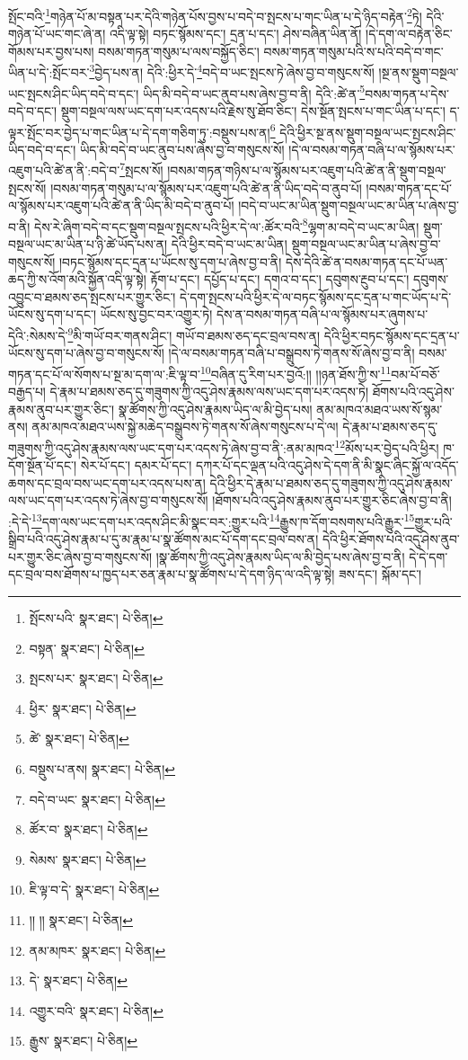 སྤོང་བའི་\footnote{སྤོངས་པའི་  སྣར་ཐང་།  པེ་ཅིན། }གཉེན་པོ་མ་བསྟན་པར་དེའི་གཉེན་པོས་བྱས་པ་བདེ་བ་སྤངས་པ་གང་ཡིན་པ་དེ་ཉིད་བརྟེན་\footnote{བསྟན་  སྣར་ཐང་།  པེ་ཅིན། }ཏེ། དེའི་གཉེན་པོ་ཡང་གང་ཞེ་ན། འདི་ལྟ་སྟེ། བཏང་སྙོམས་དང་། དྲན་པ་དང་། ཤེས་བཞིན་ཡིན་ནོ། །དེ་དག་ལ་བརྟེན་ཅིང་གོམས་པར་བྱས་པས། བསམ་གཏན་གསུམ་པ་ལས་བསྐྱོད་ཅིང་། བསམ་གཏན་གསུམ་པའི་ས་པའི་བདེ་བ་གང་ཡིན་པ་དེ་:སྤོང་བར་\footnote{སྤངས་པར་  སྣར་ཐང་།  པེ་ཅིན། }བྱེད་པས་ན། དེའི་:ཕྱིར་དེ་\footnote{ཕྱིར་  སྣར་ཐང་།  པེ་ཅིན། }བདེ་བ་ཡང་སྤངས་ཏེ་ཞེས་བྱ་བ་གསུངས་སོ། །སྔ་ནས་སྡུག་བསྔལ་ཡང་སྤངས་ཤིང་ཡིད་བདེ་བ་དང་། ཡིད་མི་བདེ་བ་ཡང་ནུབ་པས་ཞེས་བྱ་བ་ནི། དེའི་:ཚེ་ན་\footnote{ཚེ་  སྣར་ཐང་།  པེ་ཅིན། }བསམ་གཏན་པ་དེས་བདེ་བ་དང་། སྡུག་བསྔལ་ལས་ཡང་དག་པར་འདས་པའི་རྗེས་སུ་ཐོབ་ཅིང་། དེས་སྔོན་སྤངས་པ་གང་ཡིན་པ་དང་། ད་ལྟར་སྤོང་བར་བྱེད་པ་གང་ཡིན་པ་དེ་དག་གཅིག་ཏུ་:བསྡུས་པས་ན།\footnote{བསྡུས་པ་ནས།  སྣར་ཐང་།  པེ་ཅིན། } དེའི་ཕྱིར་སྔ་ནས་སྡུག་བསྔལ་ཡང་སྤངས་ཤིང་ཡིད་བདེ་བ་དང་། ཡིད་མི་བདེ་བ་ཡང་ནུབ་པས་ཞེས་བྱ་བ་གསུངས་སོ། །དེ་ལ་བསམ་གཏན་བཞི་པ་ལ་སྙོམས་པར་འཇུག་པའི་ཚེ་ན་ནི་:བདེ་བ་\footnote{བདེ་བ་ཡང་  སྣར་ཐང་།  པེ་ཅིན། }སྤངས་སོ། །བསམ་གཏན་གཉིས་པ་ལ་སྙོམས་པར་འཇུག་པའི་ཚེ་ན་ནི་སྡུག་བསྔལ་སྤངས་སོ། །བསམ་གཏན་གསུམ་པ་ལ་སྙོམས་པར་འཇུག་པའི་ཚེ་ན་ནི་ཡིད་བདེ་བ་ནུབ་པོ། །བསམ་གཏན་དང་པོ་ལ་སྙོམས་པར་འཇུག་པའི་ཚེ་ན་ནི་ཡིད་མི་བདེ་བ་ནུབ་པོ། །བདེ་བ་ཡང་མ་ཡིན་སྡུག་བསྔལ་ཡང་མ་ཡིན་པ་ཞེས་བྱ་བ་ནི། དེས་རེ་ཞིག་བདེ་བ་དང་སྡུག་བསྔལ་སྤངས་པའི་ཕྱིར་དེ་ལ་:ཚོར་བའི་\footnote{ཚོར་བ་  སྣར་ཐང་།  པེ་ཅིན། }ལྷག་མ་བདེ་བ་ཡང་མ་ཡིན། སྡུག་བསྔལ་ཡང་མ་ཡིན་པ་ཉི་ཚེ་ཡོད་པས་ན། དེའི་ཕྱིར་བདེ་བ་ཡང་མ་ཡིན། སྡུག་བསྔལ་ཡང་མ་ཡིན་པ་ཞེས་བྱ་བ་གསུངས་སོ། །བཏང་སྙོམས་དང་དྲན་པ་ཡོངས་སུ་དག་པ་ཞེས་བྱ་བ་ནི། དེས་དེའི་ཚེ་ན་བསམ་གཏན་དང་པོ་ཡན་ཆད་ཀྱི་ས་འོག་མའི་སྐྱོན་འདི་ལྟ་སྟེ། རྟོག་པ་དང་། དཔྱོད་པ་དང་། དགའ་བ་དང་། དབུགས་རྔུབ་པ་དང་། དབུགས་འབྱུང་བ་ཐམས་ཅད་སྤངས་པར་གྱུར་ཅིང་། དེ་དག་སྤངས་པའི་ཕྱིར་དེ་ལ་བཏང་སྙོམས་དང་དྲན་པ་གང་ཡོད་པ་དེ་ཡོངས་སུ་དག་པ་དང་། ཡོངས་སུ་བྱང་བར་འགྱུར་ཏེ། དེས་ན་བསམ་གཏན་བཞི་པ་ལ་སྙོམས་པར་ཞུགས་པ་དེའི་:སེམས་དེ་\footnote{སེམས་  སྣར་ཐང་།  པེ་ཅིན། }མི་གཡོ་བར་གནས་ཤིང་། གཡོ་བ་ཐམས་ཅད་དང་བྲལ་བས་ན། དེའི་ཕྱིར་བཏང་སྙོམས་དང་དྲན་པ་ཡོངས་སུ་དག་པ་ཞེས་བྱ་བ་གསུངས་སོ། །དེ་ལ་བསམ་གཏན་བཞི་པ་བསྒྲུབས་ཏེ་གནས་སོ་ཞེས་བྱ་བ་ནི། བསམ་གཏན་དང་པོ་ལ་སོགས་པ་སྔ་མ་དག་ལ་:ཇི་ལྟ་བ་\footnote{ཇི་ལྟ་བ་དེ་  སྣར་ཐང་།  པེ་ཅིན། }བཞིན་དུ་རིག་པར་བྱའོ:།། །།ཉན་ཐོས་ཀྱི་ས་\footnote{།། །།  སྣར་ཐང་།  པེ་ཅིན། }བམ་པོ་བཅོ་བརྒྱད་པ། དེ་རྣམ་པ་ཐམས་ཅད་དུ་གཟུགས་ཀྱི་འདུ་ཤེས་རྣམས་ལས་ཡང་དག་པར་འདས་ཏེ། ཐོགས་པའི་འདུ་ཤེས་རྣམས་ནུབ་པར་གྱུར་ཅིང་། སྣ་ཚོགས་ཀྱི་འདུ་ཤེས་རྣམས་ཡིད་ལ་མི་བྱེད་པས། ནམ་མཁའ་མཐའ་ཡས་སོ་སྙམ་ནས། ནམ་མཁའ་མཐའ་ཡས་སྐྱེ་མཆེད་བསྒྲུབས་ཏེ་གནས་སོ་ཞེས་གསུངས་པ་དེ་ལ། དེ་རྣམ་པ་ཐམས་ཅད་དུ་གཟུགས་ཀྱི་འདུ་ཤེས་རྣམས་ལས་ཡང་དག་པར་འདས་ཏེ་ཞེས་བྱ་བ་ནི་:ནམ་མཁའ་\footnote{ནམ་མཁར་  སྣར་ཐང་།  པེ་ཅིན། }མོས་པར་བྱེད་པའི་ཕྱིར། ཁ་དོག་སྔོན་པོ་དང་། སེར་པོ་དང་། དམར་པོ་དང་། དཀར་པོ་དང་ལྡན་པའི་འདུ་ཤེས་དེ་དག་ནི་མི་སྣང་ཞིང་སྐྱོ་ལ་འདོད་ཆགས་དང་བྲལ་བས་ཡང་དག་པར་འདས་པས་ན། དེའི་ཕྱིར་དེ་རྣམ་པ་ཐམས་ཅད་དུ་གཟུགས་ཀྱི་འདུ་ཤེས་རྣམས་ལས་ཡང་དག་པར་འདས་ཏེ་ཞེས་བྱ་བ་གསུངས་སོ། །ཐོགས་པའི་འདུ་ཤེས་རྣམས་ནུབ་པར་གྱུར་ཅིང་ཞེས་བྱ་བ་ནི། :དེ་དེ་\footnote{དེ་  སྣར་ཐང་།  པེ་ཅིན། }དག་ལས་ཡང་དག་པར་འདས་ཤིང་མི་སྣང་བར་:གྱུར་པའི་\footnote{འགྱུར་བའི་  སྣར་ཐང་།  པེ་ཅིན། }རྒྱུས་ཁ་དོག་བསགས་པའི་རྒྱུར་\footnote{རྒྱུས་  སྣར་ཐང་།  པེ་ཅིན། }གྱུར་པའི་སྒྲིབ་པའི་འདུ་ཤེས་རྣམ་པ་དུ་མ་རྣམ་པ་སྣ་ཚོགས་མང་པོ་དག་དང་བྲལ་བས་ན། དེའི་ཕྱིར་ཐོགས་པའི་འདུ་ཤེས་ནུབ་པར་གྱུར་ཅིང་ཞེས་བྱ་བ་གསུངས་སོ། །སྣ་ཚོགས་ཀྱི་འདུ་ཤེས་རྣམས་ཡིད་ལ་མི་བྱེད་པས་ཞེས་བྱ་བ་ནི། དེ་དེ་དག་དང་བྲལ་བས་ཐོགས་པ་ཁྱད་པར་ཅན་རྣམ་པ་སྣ་ཚོགས་པ་དེ་དག་ཉིད་ལ་འདི་ལྟ་སྟེ། ཟས་དང་། སྐོམ་དང་། 